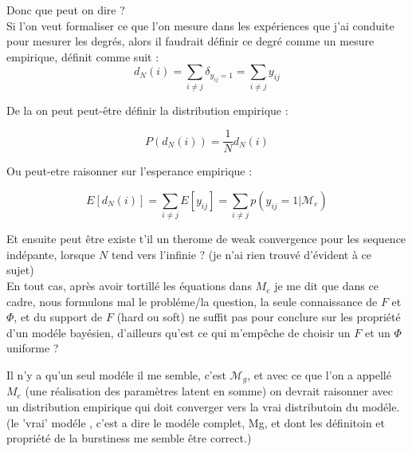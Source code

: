 \documentclass{article}
\newcommand{\mg}{\mathcal{M}_g}
\newcommand{\me}{\mathcal{M}_e}
\begin{document}
Donc que peut on dire ? ~\\

Si l'on veut formaliser ce que l'on mesure dans les expériences que j'ai conduite pour mesurer les degrés, alors il faudrait définir ce degré comme un mesure empirique, définit comme suit : 
\begin{equation}
    d_N(i) = \sum_{i\neq j} \delta_{y_{ij}=1} = \sum_{i\neq j } y_{ij}
\end{equation}


De la on peut peut-être définir la distribution empirique : 

\begin{equation}
    P(d_N(i)) = \frac{1}{N} d_N(i)
\end{equation}

Ou peut-etre raisonner sur l'esperance empirique : 

\begin{equation}
    E[d_N(i)] = \sum_{i\neq j} E[y_{ij}] = \sum_{i\neq j} p(y_{ij}=1 | \me)
\end{equation}


Et ensuite peut être existe t'il un therome de weak convergence pour les sequence indépante, lorsque $N$ tend vers l'infinie ?  (je n'ai rien trouvé d'évident à ce sujet)~\\


En tout cas, après avoir tortillé les équations dans $M_e$ je me dit que dans ce cadre,  nous formulons mal le probléme/la question, la seule connaissance de $F$ et $\Phi$, et du support de $F$ (hard ou soft) ne suffit pas pour conclure sur les propriété d'un modéle bayésien, d'ailleurs qu'est ce qui m'empêche de choisir un $F$ et un $\Phi$ uniforme ?

Il n'y a qu'un seul modéle il me semble, c'est $\mg$, et avec ce que l'on a appellé $M_e$ (une réalisation des paramètres latent en somme) on devrait raisonner avec un distribution empirique qui doit converger vers la vrai distributoin du modéle. (le 'vrai' modéle , c'est a dire le modéle complet, Mg, et dont les définitoin et propriété de la burstiness me semble être correct.)




\end{document}
